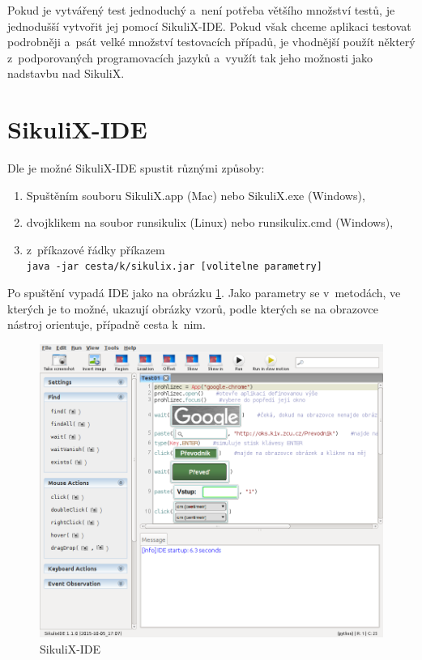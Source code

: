 	Pokud je vytvářený test jednoduchý a~není potřeba většího množství testů, je jednodušší vytvořit jej pomocí SikuliX-IDE. Pokud však chceme aplikaci testovat podrobněji a~psát velké množství testovacích případů, je vhodnější použít některý z~podporovaných programovacích jazyků a~využít tak jeho možnosti jako nadstavbu nad SikuliX.
	
	\section{SikuliX-IDE}
	Dle \citep{SikuliX} je možné SikuliX-IDE spustit různými způsoby:
	\begin{enumerate}
		\item Spuštěním souboru SikuliX.app (Mac) nebo SikuliX.exe (Windows),
		\item dvojklikem na soubor runsikulix (Linux) nebo runsikulix.cmd (Windows),
		\item z~příkazové řádky příkazem\\
		\texttt{java -jar cesta/k/sikulix.jar [volitelne parametry]}
	\end{enumerate}
	Po spuštění vypadá IDE jako na obrázku \ref{SikuliXIDE}. Jako parametry se v~metodách, ve kterých je to možné, ukazují obrázky vzorů, podle kterých se na obrazovce nástroj orientuje, případně cesta k~nim.
	\begin{figure}[ht!]
		\centering
		\caption{SikuliX-IDE}
		\label{SikuliXIDE}
		\includegraphics[width=13.5cm]{img/SikuliXIDE.png}
	\end{figure}
	

